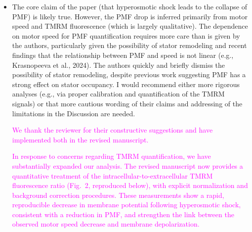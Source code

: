 \documentclass[11pt, letterpaper]{article}%
\newcommand{\response}{\textcolor{magenta}}
\begin{document}
\begin{itemize}
\item The core claim of the paper (that hyperosmotic shock leads to the collapse of PMF) is likely true. However, the PMF drop is inferred primarily from motor speed and TMRM fluorescence (which is largely qualitative). The dependence on motor speed for PMF quantification requires more care than is given by the authors, particularly given the possibility of stator remodeling and recent findings that the relationship between PMF and speed is not linear (e.g., Krasnopeeva et al., 2024). The authors quickly and briefly dismiss the possibility of stator remodeling, despite previous work suggesting PMF has a strong effect on stator occupancy. I would recommend either more rigorous analyses (e.g., via proper calibration and quantification of the TMRM signals) or that more cautious wording of their claims and addressing of the limitations in the Discussion are needed.

\response{We thank the reviewer for their constructive suggestions and have implemented both in the revised manuscript.}

\response{In response to concerns regarding TMRM quantification, we have substantially expanded our analysis. The revised manuscript now provides a quantitative treatment of the intracellular-to-extracellular TMRM fluorescence ratio (Fig.~2, reproduced below), with explicit normalization and background correction procedures. These measurements show a rapid, reproducible decrease in membrane potential following hyperosmotic shock, consistent with a reduction in PMF, and strengthen the link between the observed motor speed decrease and membrane depolarization.}


\end{itemize}
\end{document}
